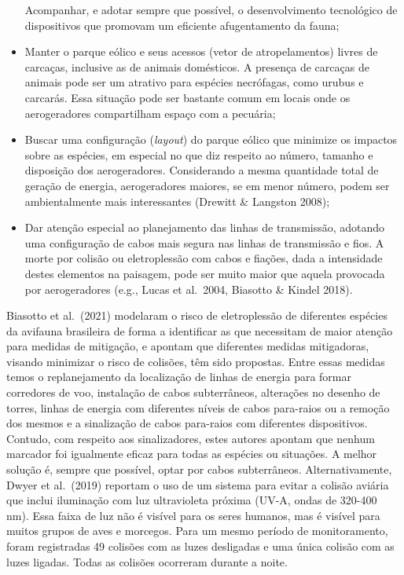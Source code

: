 \documentclass[
  oneside]{scrbook}
\begin{document}
\begin{itemize}
  Acompanhar, e adotar sempre que possível, o desenvolvimento tecnológico de dispositivos que promovam um eficiente afugentamento da fauna;
\item
  Manter o parque eólico e seus acessos (vetor de atropelamentos) livres de carcaças, inclusive as de animais domésticos. A presença de carcaças de animais pode ser um atrativo para espécies necrófagas, como urubus e carcarás. Essa situação pode ser bastante comum em locais onde os aerogeradores compartilham espaço com a pecuária;
\item
  Buscar uma configuração (\emph{layout}) do parque eólico que minimize os impactos sobre as espécies, em especial no que diz respeito ao número, tamanho e disposição dos aerogeradores. Considerando a mesma quantidade total de geração de energia, aerogeradores maiores, se em menor número, podem ser ambientalmente mais interessantes (Drewitt \& Langston 2008);
\item
  Dar atenção especial ao planejamento das linhas de transmissão, adotando uma configuração de cabos mais segura nas linhas de transmissão e fios. A morte por colisão ou eletroplessão com cabos e fiações, dada a intensidade destes elementos na paisagem, pode ser muito maior que aquela provocada por aerogeradores (e.g., Lucas et al.~2004, Biasotto \& Kindel 2018).
\end{itemize}

Biasotto et al.~(2021) modelaram o risco de eletroplessão de diferentes espécies da avifauna brasileira de forma a identificar as que necessitam de maior atenção para medidas de mitigação, e apontam que diferentes medidas mitigadoras, visando minimizar o risco de colisões, têm sido propostas. Entre essas medidas temos o replanejamento da localização de linhas de energia para formar corredores de voo, instalação de cabos subterrâneos, alterações no desenho de torres, linhas de energia com diferentes níveis de cabos para-raios ou a remoção dos mesmos e a sinalização de cabos para-raios com diferentes dispositivos. Contudo, com respeito aos sinalizadores, estes autores apontam que nenhum marcador foi igualmente eficaz para todas as espécies ou situações. A melhor solução é, sempre que possível, optar por cabos subterrâneos. Alternativamente, Dwyer et al.~(2019) reportam o uso de um sistema para evitar a colisão aviária que inclui iluminação com luz ultravioleta próxima (UV-A, ondas de 320-400 nm). Essa faixa de luz não é visível para os seres humanos, mas é visível para muitos grupos de aves e morcegos. Para um mesmo período de monitoramento, foram registradas 49 colisões com as luzes desligadas e uma única colisão com as luzes ligadas. Todas as colisões ocorreram durante a noite.
\end{document}
